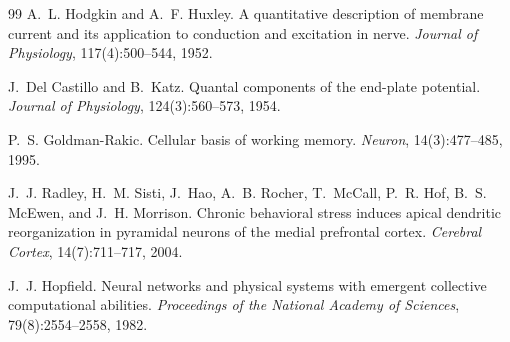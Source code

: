 ﻿\documentclass[12pt,a4paper]{article}
\theoremstyle{plain}
\theoremstyle{definition}
\theoremstyle{remark}
\begin{document}
\begin{thebibliography}{99}
		A.~L. Hodgkin and A.~F. Huxley.
		A quantitative description of membrane current and its application to
		conduction and excitation in nerve.
		\textit{Journal of Physiology}, 117(4):500--544, 1952.
		
		J.~Del Castillo and B.~Katz.
		Quantal components of the end-plate potential.
		\textit{Journal of Physiology}, 124(3):560--573, 1954.
		
		P.~S. Goldman-Rakic.
		Cellular basis of working memory.
		\textit{Neuron}, 14(3):477--485, 1995.
		
		J.~J. Radley, H.~M. Sisti, J.~Hao, A.~B. Rocher, T.~McCall, P.~R. Hof,
		B.~S. McEwen, and J.~H. Morrison.
		Chronic behavioral stress induces apical dendritic reorganization in
		pyramidal neurons of the medial prefrontal cortex.
		\textit{Cerebral Cortex}, 14(7):711--717, 2004.
		
		J.~J. Hopfield.
		Neural networks and physical systems with emergent collective
		computational abilities.
		\textit{Proceedings of the National Academy of Sciences},
		79(8):2554--2558, 1982.
		
	\end{thebibliography}
	
\end{document}
